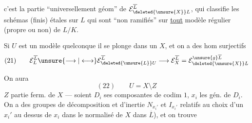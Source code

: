 
c'est la partie ``universellement géom'' de $\mathcal E_{\deleted{\unsure{X}}L}^{\overline L}$,    qui classifie les schémas (finis) étales sur $L$ qui sont ``non ramifiés'' sur \uline{tout} modèle  régulier (propre ou non) de $L/K$.


Si $U$ est un modèle quelconque\unsure{,|;} il se plonge dans un $X$, et on a des hom surjectifs
\[
(21)\qquad \mathcal E_L^{\overline L}\unsure{\longrightarrow|\longleftrightarrow}\mathcal E_{\deleted{\unsure{L}}U}^{\overline L}\longrightarrow\mathcal E_X^{\overline L}=\mathcal E_{\deleted{\unsure{X}}L}^{\unsure{g}\overline L}
\]

On aura 
\[
(22)\qquad U=X\setminus Z
\]
$Z$ partie ferm. de $X$ --- soient $D_i$ ses composantes de codim $1$, $x_i$ les  gén. de $D_i$. On a des groupes de décomposition et d'inertie $N_{x_i'}$ et $I_{x_i'}$   relatifs au choix d'un $x_i'$ au dessus de $x_i$ dans le normalisé de $X$ dans $\overline L$), et on trouve

